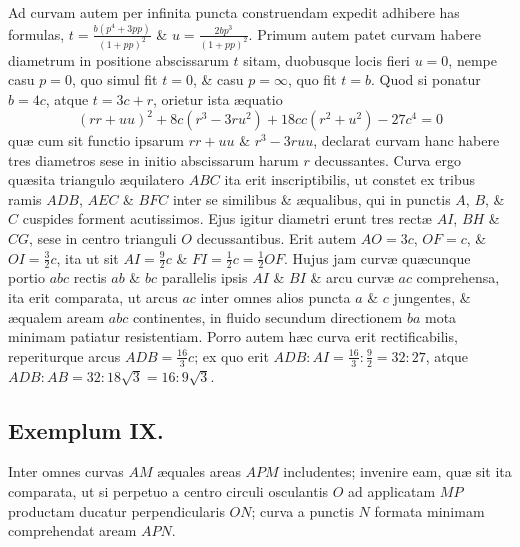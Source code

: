 Ad curvam autem per infinita puncta construendam expedit adhibere has formulas, $t=\frac{b(p^4+3pp)}{(1+pp)^2}$ \& $u=\frac{2bp^3}{(1+pp)^2}$. Primum autem patet curvam habere diametrum in positione abscissarum $t$ sitam, duobusque locis fieri $u=0$, nempe casu $p=0$, quo simul fit $t=0$, \& casu $p=\infty$, quo fit $t=b$. Quod si ponatur $b=4c$, atque $t=3c+r$, orietur ista æquatio
\[(rr+uu)^2+8c(r^3-3ru^2)+18cc(r^2+u^2)-27c^4=0\]
quæ cum sit functio ipsarum $rr+uu$ \& $r^3-3ruu$, declarat curvam hanc habere tres diametros sese in initio abscissarum harum $r$ decussantes. Curva ergo quæsita triangulo æquilatero $ABC$ ita erit inscriptibilis, ut constet ex tribus ramis $ADB$, $AEC$ \& $BFC$ inter se similibus \& æqualibus, qui in punctis $A$, $B$, \& $C$ cuspides forment acutissimos. Ejus igitur diametri erunt tres rectæ $AI$, $BH$ \& $CG$, sese in centro trianguli $O$ decussantibus. Erit autem $AO=3c$, $OF=c$, \& $OI=\frac32c$, ita ut sit $AI=\frac92c$ \& $FI=\frac12c=\frac12OF$. Hujus jam curvæ quæcunque portio $abc$ rectis $ab$ \& $bc$ parallelis ipsis $AI$ \& $BI$ \& arcu curvæ $ac$ comprehensa, ita erit comparata, ut arcus $ac$ inter omnes alios puncta $a$ \& $c$ jungentes, \& æqualem aream $abc$ continentes, in fluido secundum directionem $ba$ mota minimam patiatur resistentiam. Porro autem hæc curva erit rectificabilis, reperiturque arcus $ADB=\frac{16}3c$; ex quo erit $ADB:AI=\frac{16}3:\frac92=32:27$, atque $ADB:AB=32:18\sqrt3=16:9\sqrt3$.

\subsection*{Exemplum IX.}
Inter omnes curvas $AM$ æquales areas $APM$ includentes; invenire eam, quæ sit ita comparata, ut si perpetuo a centro circuli osculantis $O$ ad applicatam $MP$ productam ducatur perpendicularis $ON$; curva a punctis $N$ formata minimam comprehendat aream $APN$.

